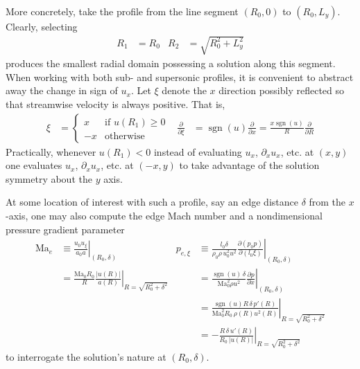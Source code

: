 \documentclass[letterpaper,11pt,nointlimits,reqno]{amsart}
\newcommand{\Mach}[1][]{\mbox{Ma}_{#1}}
\begin{document}
More concretely, take the profile from the line segment $\left(R_0,0\right)$ to
$\left(R_0,L_y\right)$.  Clearly, selecting
\begin{align}
  R_1 &= R_0
&
  R_2 &= \sqrt{R_0^2 + L_y^2}
\end{align}
produces the smallest radial domain possessing a solution along this segment.
When working with both sub- and supersonic profiles, it is convenient to
abstract away the change in sign of $u_x$.  Let $\xi$ denote the $x$ direction
possibly reflected so that streamwise velocity is always positive.  That is,
\begin{align}
  \xi &= \begin{cases}  x &\mbox{if } u\!\left(R_1\right) \geq 0 \\
                       -x &\mbox{otherwise}
  \end{cases}
&
    \frac{\partial}{\partial\xi}
 &= \operatorname{sgn}(u) \frac{\partial}{\partial{}x}
  = \frac{x \operatorname{sgn}(u)}{R} \frac{\partial}{\partial{}R}
\label{eq:xicoorddef}
\end{align}
Practically, whenever $u\left(R_1\right) < 0$ instead of evaluating $u_x$,
$\partial_x u_x$, etc. at $\left(x,y\right)$ one evaluates $u_x$, $\partial_x
u_x$, etc. at $\left(-x,y\right)$ to take advantage of the solution symmetry
about the $y$ axis.

At some location of interest with such a profile, say an edge distance
$\delta$ from the $x$-axis, one may also compute the edge Mach number
and a nondimensional pressure gradient parameter
\begin{align}
  \Mach[e]{}
  &\equiv
  \left. \frac{u_0 u_\xi}{a_0 a} \right|_{\left(R_0,\delta\right)}
&
  p_{e,\xi}
  &\equiv
  \left.
  \frac{l_0 \delta}{\rho_0 \rho \, u_0^2 u^2}
    \frac{\partial\left(p_0 p\right)}{\partial\left(l_0 \xi\right)}
  \right|_{\left(R_0,\delta\right)}
\\&=
  \left.
    \frac{\Mach[0]{} R_0}{R}
    \frac{\left|u\!\left(R\right)\right|}
         {      a\!\left(R\right)       }
  \right|_{R = \sqrt{R_0^2 + \delta^2}}
&
  &=
  \left.
    \frac{\operatorname{sgn}(u) \, \delta}{\Mach[0]^2 \rho u^2}
      \frac{\partial{}p}{\partial{}x}
  \right|_{\left(R_0,\delta\right)}
\\
&&
  &=
  \left.
    \frac{\operatorname{sgn}(u) R \, \delta \, p'\!\left(R\right)}
         {\Mach[0]^2 R_0 \, \rho\!\left(R\right) u^2\!\left(R\right)}
  \right|_{R=\sqrt{R_0^2 + \delta^2}}
\\
&&
  &=
  - \left.
      \frac{R \, \delta \, u'\!\left(R\right)}
           {R_0 \, \left|u\!\left(R\right)\right|}
  \right|_{R=\sqrt{R_0^2 + \delta^2}}
\label{eq:qoidef}
\end{align}
to interrogate the solution's nature at $\left(R_0, \delta\right)$.
\end{document}
